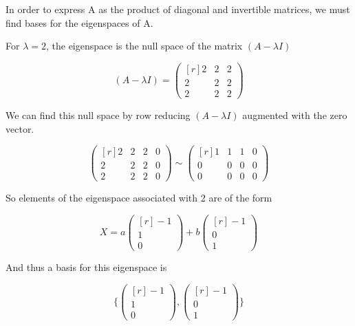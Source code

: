 \documentclass[11pt]{amsart}
\begin{document}
\vspace{10mm}

In order to express A as the product of diagonal and invertible matrices, we must find bases for the eigenspaces of A.

For $\lambda=2$, the eigenspace is the null space of the matrix $(A-\lambda I)$

\[(A-\lambda I)=
\begin{pmatrix*}[r]
2&2&2\\
2&2&2\\
2&2&2
\end{pmatrix*}
\]

\vspace{1mm}

We can find this null space by row reducing $(A-\lambda I)$ augmented with the zero vector.

\[
\begin{pmatrix*}[r]
2&2&2&0\\
2&2&2&0\\
2&2&2&0
\end{pmatrix*}
\sim
\begin{pmatrix*}[r]
1&1&1&0\\
0&0&0&0\\
0&0&0&0
\end{pmatrix*}
\]

\vspace{3mm}

So elements of the eigenspace associated with 2 are of the form

\[X=a
\begin{pmatrix*}[r]
-1\\
1\\
0
\end{pmatrix*}
+b
\begin{pmatrix*}[r]
-1\\
0\\
1
\end{pmatrix*}
\]

And thus a basis for this eigenspace is 

\[
\Bigg\{
\begin{pmatrix*}[r]
-1\\
1\\
0
\end{pmatrix*}
,
\begin{pmatrix*}[r]
-1\\
0\\
1
\end{pmatrix*}
\Bigg\}
\]
\end{document}

